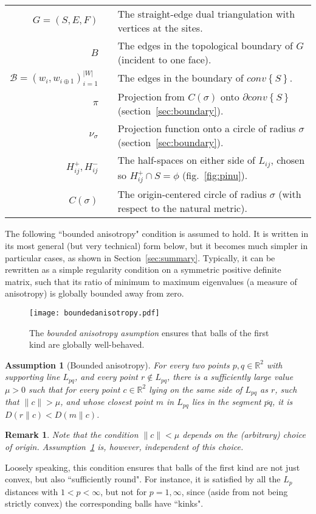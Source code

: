\documentclass[11pt]{article}
\newtheorem{assumption}{Assumption}
\newtheorem{remark}{Remark}
\newcommand{\Sites}{S}
\newcommand{\D}[2]{D\left(#1 \parallel #2\right)}
\newcommand{\CHS}{{conv}\left\{\Sites\right\}}
\begin{document}
\begin{table}[htbp]
\begin{center}
\begin{tabular}{r c p{11cm} }
$G=(\Sites,E,F)$ && The straight-edge dual triangulation with vertices at the sites. \\
$B$ && The edges in the topological boundary of $G$ (incident to one face). \\
$\mathcal{B}=(w_i,w_{i\oplus 1})_{i=1}^{|W|}$ && The edges in the boundary of $\CHS$. \\
$\pi$ && Projection from $C(\sigma)$ onto $\partial\CHS$ (section~\ref{sec:boundary}). \\
$\nu_\sigma$ && Projection function onto a circle of radius $\sigma$ (section~\ref{sec:boundary}). \\
$H^{+}_{ij}, H^{-}_{ij}$ && The half-spaces on either side of $L_{ij}$, chosen so $H^{+}_{ij}\cap\Sites=\phi$ (fig.~\ref{fig:pinu}). \\
$C(\sigma)$ && The origin-centered circle of radius $\sigma$ (with respect to the natural metric). \\
\bottomrule
\end{tabular}
\end{center}
\end{table}




The following ``bounded anisotropy" condition is assumed to hold. 
It is written in its most general (but very technical) form below, 
	but it becomes much simpler in particular cases, as shown in Section~\ref{sec:summary}. 
Typically, it can be rewritten as a simple regularity condition on a symmetric positive definite matrix, 
	such that its ratio of minimum to maximum eigenvalues
	(a measure of anisotropy) is globally bounded away from zero. 


\begin{figure}[thb]
\centering
\texttt{[image: boundedanisotropy.pdf]}
\caption{The \emph{bounded anisotropy asumption} ensures that balls of the first kind are globally well-behaved. }
\label{fig:gamma}
\end{figure}


\begin{assumption}[Bounded anisotropy]\label{ass:BAA}
For every two points $p,q\in\mathbb{R}^2$ with supporting line $L_{pq}$, and every point $r\not\in L_{pq}$, 
	there is a sufficiently large value $\mu > 0$ such that 
	for every point $c\in\mathbb{R}^2$ lying on the same side of $L_{pq}$ as $r$, 
		such that $\|c\| > \mu$, and 
		whose closest point $m$ in $L_{pq}$ lies in the segment $\overline{pq}$, 
	it is $\D{r}{c} < \D{m}{c}$. 
\end{assumption}
\begin{remark}
Note that the condition $\|c\|<\mu$ depends on the (arbitrary) choice of origin. 
Assumption~\ref{ass:BAA} is, however, independent of this choice. 
\end{remark}
Loosely speaking, this condition ensures that balls of the first kind are 
	not just convex, but also ``sufficiently round". 
For instance, it is satisfied by all the $L_p$ distances with $1<p<\infty$, 
	but not for $p=1,\infty$, since (aside from not being strictly convex) the corresponding balls have ``kinks". 
\end{document}
